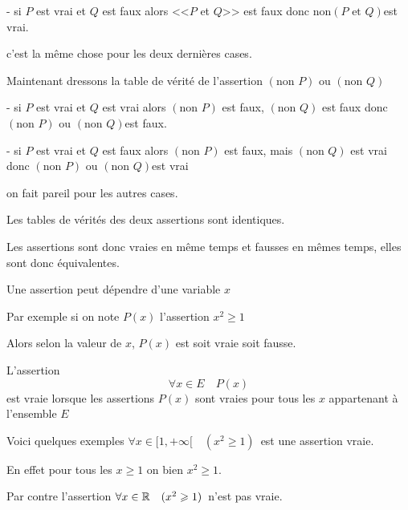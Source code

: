 \change


 - si $P$ est vrai et $Q$ est faux alors <<$P$ et $Q$>> est faux
donc \og $\text{non}(P \text{ et } Q)$\fg  est vrai.

\change

c'est la même chose pour les deux dernières cases.

\change



Maintenant dressons la table de vérité de l'assertion \og $(\text{non } P)  \text{ ou } (\text{non }Q)$\fg 

\change

- si $P$ est vrai et $Q$ est vrai alors $(\text{non } P)$ est faux, $(\text{non } Q)$ est faux
donc \og $(\text{non } P)  \text{ ou } (\text{non }Q)$\fg  est faux.

\change

 - si $P$ est vrai et $Q$ est faux alors $(\text{non } P)$ est faux, mais $(\text{non } Q)$ est vrai
donc  \og $(\text{non } P)  \text{ ou } (\text{non }Q)$\fg  est vrai

\change

on fait pareil pour les autres cases.



Les tables de vérités des deux assertions sont identiques.

Les assertions sont donc vraies en même temps et fausses
en mêmes temps, elles sont donc équivalentes.


\diapo

Une assertion peut dépendre d'une variable $x$


Par exemple si on note $P(x)$ l'assertion \og $x^2 \ge 1$\fg

Alors selon la valeur de $x$, $P(x)$ est soit vraie soit fausse.

\change

L'assertion 
$$\forall x \in E \quad P(x)$$
est vraie lorsque les assertions $P(x)$ sont vraies pour tous les $x$
appartenant à l'ensemble $E$

\change

Voici quelques exemples 
$\forall x \in [1,+\infty[ \quad (x^2\ge 1)$\fg\ est une assertion vraie.

En effet pour tous les $x\ge1$ on bien $x^2 \ge 1$.


\change

Par contre l'assertion
 \og $\forall x \in \mathbb{R} \quad (x^2\geqslant 1)$\fg\
n'est pas vraie. 

